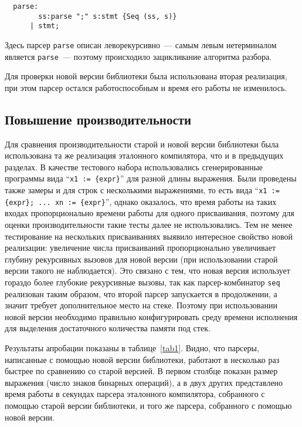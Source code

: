 \documentclass[conference]{IEEEtran}
\begin{document}
\begin{lstlisting}
  parse:
        ss:parse ";" s:stmt {Seq (ss, s)}
      | stmt;
\end{lstlisting}

Здесь парсер \lstinline|parse| описан леворекурсивно~--- самым левым нетерминалом является \lstinline|parse|~--- поэтому происходило зацикливание алгоритма разбора.

Для проверки новой версии библиотеки была использована вторая реализация, при этом парсер остался работоспособным и время его работы не изменилось.

\subsection{Повышение производительности}

Для сравнения производительности старой и новой версии библиотеки была использована та же реализация эталонного компилятора, что и в предыдущих разделах. В качестве тестового
набора использовались сгенерированные программы вида ``\lstinline|x1 := {expr}|'' для разной длины выражения.  Были проведены также замеры и для строк с несколькими
выражениями, то есть вида ``\lstinline|x1 := {expr}; ... xn := {expr}|'', однако оказалось, что время работы на таких входах пропорционально времени работы для одного присваивания,
поэтому для оценки производительности такие тесты далее не использовались. Тем не менее тестирование на нескольких присваиваниях выявило интересное свойство новой реализации:
увеличение числа присваиваний пропорционально увеличивает глубину рекурсивных вызовов для новой версии (при использовании старой версии такого не наблюдается). Это связано с тем,
что новая версия использует гораздо более глубокие рекурсивные вызовы, так как парсер-комбинатор \lstinline|seq| реализован таким образом, что второй парсер запускается в продолжении,
а значит требует дополнительное место на стеке. Поэтому при использовании новой версии необходимо правильно конфигурировать среду времени исполнения для выделения достаточного
количества памяти под стек.

Результаты апробации показаны в таблице~\ref{tab1}. Видно, что парсеры, написанные с помощью новой версии библиотеки, работают в несколько раз быстрее по сравнению со старой версией.
В первом столбце показан размер выражения (число знаков бинарных операций), а в двух других представлено время работы в секундах парсера эталонного компилятора, собранного с помощью старой версии библиотеки, и того же парсера, собранного с помощью новой версии.
\end{document}
